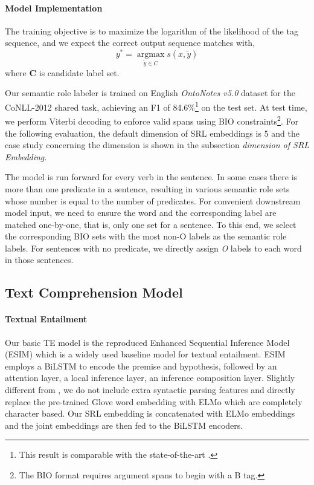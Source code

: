 \documentclass[11pt]{article}
\begin{document}
\paragraph{Model Implementation}
The training objective is to maximize the logarithm of the likelihood of the tag sequence, and we expect the correct output sequence matches with,
\begin{equation}
y^{*} = \mathop{argmax}\limits_{\widetilde{y}\in C}s(x,\widetilde{y})
\end{equation}
where $\mathbf{C}$ is candidate label set.

Our semantic role labeler is trained on English \emph{OntoNotes v5.0} dataset \citep{pradhan2013towards}  for the CoNLL-2012 shared task, achieving an F1 of 84.6\%\footnote{This result is comparable with the state-of-the-art \citep{li2019dependency}.} on the test set. At test time, we perform Viterbi decoding to enforce valid spans using BIO constraints\footnote{The BIO format requires argument spans to begin with a B tag.}. For the following evaluation, the default dimension of SRL embeddings is 5 and the case study concerning the dimension is shown in the subsection \emph{dimension of SRL Embedding}.

The model is run forward for every verb in the sentence.  In some cases there is more than one predicate in a sentence, resulting in various semantic role sets whose number is equal to the number of predicates. For convenient downstream model input, we need to ensure the word and the corresponding label are matched one-by-one, that is, only one set for a sentence. To this end, we select the corresponding BIO sets with the most non-O labels as the semantic role labels. For sentences with no predicate, we directly assign \emph{O} labels to each word in those sentences. 

\subsection{Text Comprehension Model}
\paragraph{Textual Entailment} Our basic TE model is the reproduced Enhanced Sequential Inference Model (ESIM) \citep{Chen2017Enhanced} which is a widely used baseline model for textual entailment. ESIM employs a BiLSTM to encode the premise and hypothesis, followed by an attention layer, a local inference layer, an inference composition layer. Slightly different from \citep{Chen2017Enhanced}, we do not include extra syntactic parsing features and directly replace the pre-trained Glove word embedding with ELMo which are completely character based. Our SRL embedding is concatenated with ELMo embeddings and the joint embeddings are then fed to the BiLSTM encoders. 
\end{document}
